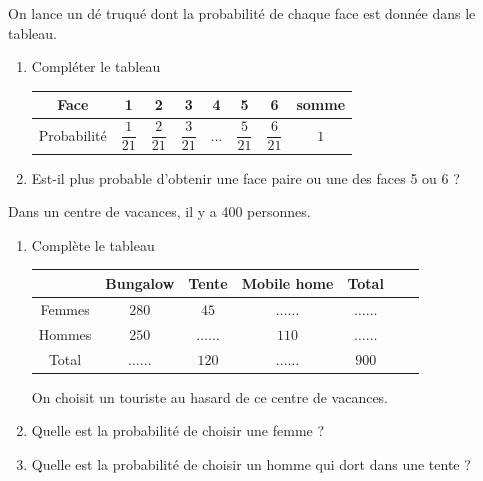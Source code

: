 \begin{pageParcourst}


On lance un dé truqué dont la probabilité de chaque face est donnée dans le tableau.

\begin{enumerate}[leftmargin=*]

\item Compléter le tableau

\begin{tabular}{|c|c|c|c|c|c|c|c|}
\hline 
Face & 1 & 2 & 3 & 4 & 5 & 6 & somme \\ 
\hline 
Probabilité & $\dfrac{1}{21}$ & $\dfrac{2}{21}$  & $\dfrac{3}{21}$  &  $\ldots$   & $\dfrac{5}{21}$  & $\dfrac{6}{21}$  & $1$ \\ 
\hline 
\end{tabular}

\item Est-il plus probable d'obtenir une face paire ou une des faces 5 ou 6 ? 

\end{enumerate}

 
Dans un centre de vacances, il y a 400 personnes. 
 
\begin{enumerate}[leftmargin=*]

\item Complète le tableau

\begin{tabular}{|c|c|c|c|c|c|c|}
\hline 
  & Bungalow  & Tente & Mobile home & Total \\ 
\hline 
Femmes   & $280$ & $45$ &  $\ldots\ldots$ & $\ldots\ldots$ \\ 
\hline 
Hommes  & $250$ & $\ldots\ldots$ &  $110$ & $\ldots\ldots$ \\ 
\hline 
Total  &  $\ldots\ldots$ & $120$ &  $\ldots\ldots$ & $900$ \\ 
\hline 
\end{tabular}

On choisit un touriste au hasard de ce centre de vacances.
 
\item Quelle est la probabilité de choisir une femme  ?
\item Quelle est la probabilité de choisir un homme qui dort dans une tente ?
\end{enumerate}





\end{pageParcourst}
